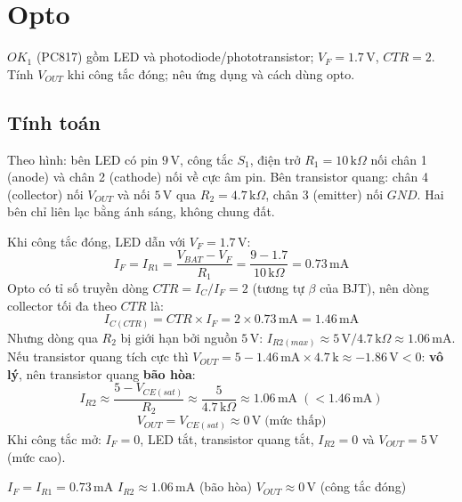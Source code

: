 \section{Opto}
$OK_1$ (PC817) gồm LED và photodiode/phototransistor; $V_F = 1.7\,\text{V}$, $CTR = 2$. Tính $V_{OUT}$ khi công tắc đóng; nêu ứng dụng và cách dùng opto.


\subsection{Tính toán}
Theo hình: bên LED có pin $9\,\text{V}$, công tắc $S_1$, điện trở $R_1 = 10\,\text{k}\Omega$ nối chân 1 (anode) và chân 2 (cathode) nối về cực âm pin. Bên transistor quang: chân 4 (collector) nối $V_{OUT}$ và nối $5\,\text{V}$ qua $R_2 = 4.7\,\text{k}\Omega$, chân 3 (emitter) nối $GND$. Hai bên chỉ liên lạc bằng ánh sáng, không chung đất.

Khi công tắc đóng, LED dẫn với $V_F = 1.7\,\text{V}$:
\[ I_F = I_{R1} = \frac{V_{BAT} - V_F}{R_1} = \frac{9 - 1.7}{10\,\text{k}\Omega} = 0.73\,\text{mA} \]
Opto có tỉ số truyền dòng $CTR = I_C / I_F = 2$ (tương tự $\beta$ của BJT), nên dòng collector tối đa theo $CTR$ là:
\[ I_{C(CTR)} = CTR\times I_F = 2\times 0.73\,\text{mA} = 1.46\,\text{mA} \]
Nhưng dòng qua $R_2$ bị giới hạn bởi nguồn $5\,\text{V}$: $I_{R2(max)} \approx 5\,\text{V}/4.7\,\text{k}\Omega \approx 1.06\,\text{mA}$. Nếu transistor quang tích cực thì $V_{OUT} = 5 - 1.46\,\text{mA}\times 4.7\,\text{k} \approx -1.86\,\text{V} < 0$: \textbf{vô lý}, nên transistor quang \textbf{bão hòa}:
\[ I_{R2} \approx \frac{5 - V_{CE(sat)}}{R_2} \approx \frac{5}{4.7\,\text{k}\Omega} \approx 1.06\,\text{mA} \;(< 1.46\,\text{mA}) \]
\[ V_{OUT} = V_{CE(sat)} \approx 0\,\text{V} \;\text{(mức thấp)} \]
Khi công tắc mở: $I_F = 0$, LED tắt, transistor quang tắt, $I_{R2} = 0$ và $V_{OUT} = 5\,\text{V}$ (mức cao).

\begin{dapsobox}
$I_F = I_{R1} = 0.73\,\text{mA}$ \quad $I_{R2} \approx 1.06\,\text{mA}$ (bão hòa) \quad $V_{OUT} \approx 0\,\text{V}$ (công tắc đóng)
\end{dapsobox}

